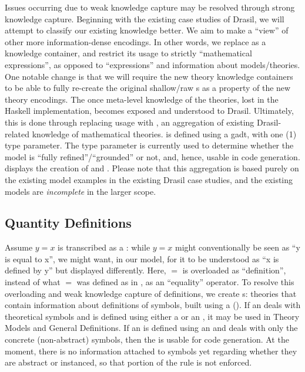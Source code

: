 Issues occurring due to weak knowledge capture may be resolved through strong
knowledge capture. Beginning with the existing case studies of Drasil, we will
attempt to classify our existing knowledge better. We aim to make
\RelationConcept{} a ``view'' of other more information-dense encodings. In
other words, we replace \Expr{} as a knowledge container, and restrict its usage
to strictly ``mathematical expressions'', as opposed to ``expressions'' and
information about models/theories. One notable change is that we will require
the new theory knowledge containers to be able to fully re-create the original
shallow/raw \Expr{}s as a property of the new theory encodings. The once
meta-level knowledge of the theories, lost in the Haskell implementation,
becomes exposed and understood to Drasil. Ultimately, this is done through
replacing \RelationConcept{} usage with \ModelKind{}, an aggregation of existing
Drasil-related knowledge of mathematical theories. \ModelKind{} is defined using
a \acs{gadt}, with one (1) type parameter. The type parameter is currently used
to determine whether the model is ``fully refined''/``grounded'' or not, and,
hence, usable in code generation.  displays the
creation of \ModelKind{} and \ModelKinds{}. Please note that this aggregation is
based purely on the existing model examples in the existing Drasil case studies,
and the existing models are \textit{incomplete} in the larger scope.


\currentModelKindsHaskell{}

\subsection{Quantity Definitions}

\currentQDefinitionHaskell{}

Assume \(y = x\) is transcribed as a \RelationConcept{}: while \(y = x\) might
conventionally be seen as ``y is equal to x'', we might want, in our model, for
it to be understood as ``x is defined by y'' but displayed differently. Here,
\(=\) is overloaded as ``definition'', instead of what \(=\) was defined as in
\Expr{}, as an ``equality'' operator. To resolve this overloading and weak
knowledge capture of definitions, we create \EquationalModel{}s: theories that
contain information about definitions of symbols, built using a \QDefinition{}
(). If an \EquationalModel{} deals with
theoretical symbols and is defined using either a \ModelExpr{} or an \Expr{}, it
may be used in Theory Models and General Definitions. If an \EquationalModel{}
is defined using an \Expr{} and deals with only the concrete (non-abstract)
symbols, then the \EquationalModel{} is usable for code generation. At the
moment, there is no information attached to symbols yet regarding whether they
are abstract or instanced, so that portion of the rule is not enforced.

